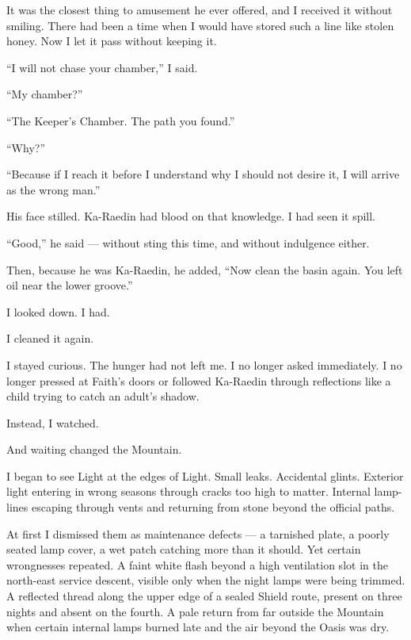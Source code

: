 It was the closest thing to amusement he ever offered, and I received it without smiling. There had been a time when I would have stored such a line like stolen honey. Now I let it pass without keeping it.\par

``I will not chase your chamber,'' I said.\par

``My chamber?''\par

``The Keeper's Chamber. The path you found.''\par

``Why?''\par

``Because if I reach it before I understand why I should not desire it, I will arrive as the wrong man.''\par

His face stilled. Ka-Raedin had blood on that knowledge. I had seen it spill.\par

``Good,'' he said --- without sting this time, and without indulgence either.\par

Then, because he was Ka-Raedin, he added, ``Now clean the basin again. You left oil near the lower groove.''\par

I looked down. I had.\par

I cleaned it again.\par

I stayed curious. The hunger had not left me. I no longer asked immediately. I no longer pressed at Faith's doors or followed Ka-Raedin through reflections like a child trying to catch an adult's shadow.\par

Instead, I watched.\par

And waiting changed the Mountain.\par

I began to see Light at the edges of Light. Small leaks. Accidental glints. Exterior light entering in wrong seasons through cracks too high to matter. Internal lamp-lines escaping through vents and returning from stone beyond the official paths.\par

At first I dismissed them as maintenance defects --- a tarnished plate, a poorly seated lamp cover, a wet patch catching more than it should. Yet certain wrongnesses repeated. A faint white flash beyond a high ventilation slot in the north-east service descent, visible only when the night lamps were being trimmed. A reflected thread along the upper edge of a sealed Shield route, present on three nights and absent on the fourth. A pale return from far outside the Mountain when certain internal lamps burned late and the air beyond the Oasis was dry.\par

